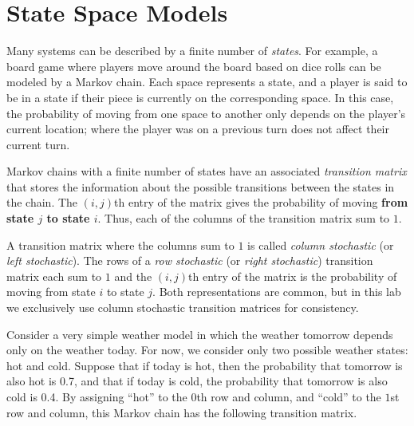 \label{lab:Markov}

\section*{State Space Models} %

Many systems can be described by a finite number of \emph{states}.
For example, a board game where players move around the board based on dice rolls can be modeled by a Markov chain.
Each space represents a state, and a player is said to be in a state if their piece is currently on the corresponding space.
In this case, the probability of moving from one space to another only depends on the player's current location; where the player was on a previous turn does not affect their current turn.

Markov chains with a finite number of states have an associated \emph{transition matrix} that stores the information about the possible transitions between the states in the chain.
The $(i,j)$th entry of the matrix gives the probability of moving \textbf{from state $j$ to state $i$}.
Thus, each of the columns of the transition matrix sum to $1$.

\begin{info} %
A transition matrix where the columns sum to $1$ is called \emph{column stochastic} (or \emph{left stochastic}).
The rows of a \emph{row stochastic} (or \emph{right stochastic}) transition matrix each sum to $1$ and the $(i,j)$th entry of the matrix is the probability of moving from state $i$ to state $j$.
Both representations are common, but in this lab we exclusively use column stochastic transition matrices for consistency.
\end{info}

Consider a very simple weather model in which the weather tomorrow depends only on the weather today.
For now, we consider only two possible weather states: hot and cold.
Suppose that if today is hot, then the probability that tomorrow is also hot is 0.7, and that if today is cold, the probability that tomorrow is also cold is 0.4.
By assigning ``hot'' to the $0$th row and column, and ``cold'' to the $1$st row and column, this Markov chain has the following transition matrix.

